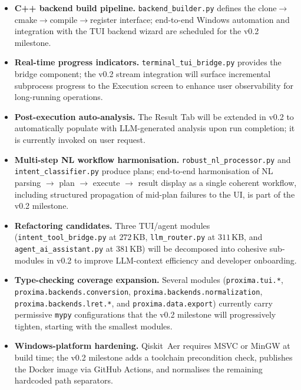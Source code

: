\documentclass[11pt,a4paper]{article}
\begin{document}
\begin{itemize}[leftmargin=1.5cm]
  \item \textbf{C++ backend build pipeline.} \texttt{backend\_builder.py} defines
        the clone$\to$cmake$\to$compile$\to$register interface; end-to-end
        Windows automation and integration with the TUI backend wizard are
        scheduled for the v0.2 milestone.
  \item \textbf{Real-time progress indicators.} \texttt{terminal\_tui\_bridge.py}
        provides the bridge component; the v0.2 stream integration will surface
        incremental subprocess progress to the Execution screen to enhance
        user observability for long-running operations.
  \item \textbf{Post-execution auto-analysis.} The Result Tab will be extended in
        v0.2 to automatically populate with LLM-generated analysis upon run
        completion; it is currently invoked on user request.
  \item \textbf{Multi-step NL workflow harmonisation.}
        \texttt{robust\_nl\_processor.py} and \texttt{intent\_classifier.py}
        produce plans; end-to-end harmonisation of NL parsing $\to$ plan $\to$
        execute $\to$ result display as a single coherent workflow, including
        structured propagation of mid-plan failures to the UI, is part of the
        v0.2 milestone.
  \item \textbf{Refactoring candidates.} Three TUI/agent modules
        (\texttt{intent\_tool\_bridge.py} at $272$\,KB,
        \texttt{llm\_router.py} at $311$\,KB, and
        \texttt{agent\_ai\_assistant.py} at $381$\,KB) will be decomposed into
        cohesive sub-modules in v0.2 to improve LLM-context efficiency and
        developer onboarding.
  \item \textbf{Type-checking coverage expansion.} Several modules
        (\texttt{proxima.tui.*}, \texttt{proxima.backends.conversion},
        \texttt{proxima.backends.normalization}, \texttt{proxima.backends.lret.*},
        and \texttt{proxima.data.export}) currently carry permissive
        \texttt{mypy} configurations that the v0.2 milestone will progressively
        tighten, starting with the smallest modules.
  \item \textbf{Windows-platform hardening.} Qiskit~Aer requires MSVC or MinGW
        at build time; the v0.2 milestone adds a toolchain precondition check,
        publishes the Docker image via GitHub Actions, and normalises the
        remaining hardcoded path separators.
\end{itemize}
\end{document}
